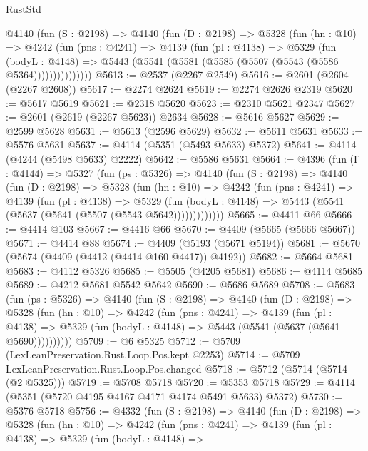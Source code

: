 \begin{lexlean}{RustStd}
\begin{coremodule}
{\begin{coremodule}
{{{{{{{{{{{{{{        @4140
          (fun (S : @2198) =>
          @4140
            (fun (D : @2198) =>
            @5328
              (fun (hn : @10) =>
              @4242
                (fun (pns : @4241) =>
                @4139
                  (fun (pl : @4138) =>
                  @5329
                    (fun (bodyL : @4148) =>
                    @5443 (@5541 (@5581 (@5585 (@5507 (@5543 (@5586 @5364)))))))))))))))
@5613 := @2537 (@2267 @2549)
@5616 := @2601 (@2604 (@2267 @2608))
@5617 := @2274 @2624
@5619 := @2274 @2626 @2319
@5620 := @5617 @5619
@5621 := @2318 @5620
@5623 := @2310 @5621 @2347
@5627 := @2601 (@2619 (@2267 @5623)) @2634
@5628 := @5616 @5627
@5629 := @2599 @5628
@5631 := @5613 (@2596 @5629)
@5632 := @5611 @5631
@5633 := @5576 @5631
@5637 := @4114 (@5351 (@5493 @5633) @5372)
@5641 := @4114 (@4244 (@5498 @5633) @2222)
@5642 := @5586 @5631
@5664 := @4396
    (fun (Γ : @4144) =>
    @5327
      (fun (ps : @5326) =>
      @4140
        (fun (S : @2198) =>
        @4140
          (fun (D : @2198) =>
          @5328
            (fun (hn : @10) =>
            @4242
              (fun (pns : @4241) =>
              @4139
                (fun (pl : @4138) =>
                @5329
                  (fun (bodyL : @4148) =>
                  @5443 (@5541 (@5637 (@5641 (@5507 (@5543 @5642)))))))))))))
@5665 := @4411 @66
@5666 := @4414 @103
@5667 := @4416 @66
@5670 := @4409 (@5665 (@5666 @5667))
@5671 := @4414 @88
@5674 := @4409 (@5193 (@5671 @5194))
@5681 := @5670 (@5674 (@4409 (@4412 (@4414 @160 @4417)) @4192))
@5682 := @5664 @5681
@5683 := @4112 @5326
@5685 := @5505 (@4205 @5681)
@5686 := @4114 @5685
@5689 := @4212 @5681 @5542 @5642
@5690 := @5686 @5689
@5708 := @5683
    (fun (ps : @5326) =>
    @4140
      (fun (S : @2198) =>
      @4140
        (fun (D : @2198) =>
        @5328
          (fun (hn : @10) =>
          @4242
            (fun (pns : @4241) =>
            @4139
              (fun (pl : @4138) =>
              @5329 (fun (bodyL : @4148) => @5443 (@5541 (@5637 (@5641 @5690))))))))))
@5709 := @6 @5325
@5712 := @5709 (LexLeanPreservation.Rust.Loop.Pos.kept @2253)
@5714 := @5709 LexLeanPreservation.Rust.Loop.Pos.changed
@5718 := @5712 (@5714 (@5714 (@2 @5325)))
@5719 := @5708 @5718
@5720 := @5353 @5718
@5729 := @4114 (@5351 (@5720 @4195 @4167 @4171 @4174 @5491 @5633) @5372)
@5730 := @5376 @5718
@5756 := @4332
    (fun (S : @2198) =>
    @4140
      (fun (D : @2198) =>
      @5328
        (fun (hn : @10) =>
        @4242
          (fun (pns : @4241) =>
          @4139
            (fun (pl : @4138) =>
            @5329
              (fun (bodyL : @4148) =>
}}}}}}}}}}}}}}
\end{coremodule}}
\end{coremodule}
\end{lexlean}
